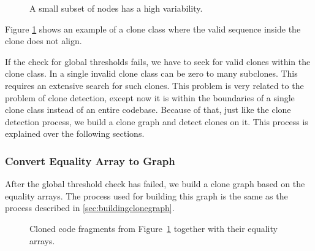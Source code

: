 \begin{figure}[H]
\begin{parcolumns}{3}
\end{parcolumns}
\caption{A small subset of nodes has a high variability.}
\label{fig:2rvariabilityhigh3}
\end{figure}

Figure \ref{fig:2rvariabilityhigh3} shows an example of a clone class where the valid sequence inside the clone does not align.

If the check for global thresholds fails, we have to seek for valid clones within the clone class. In a single invalid clone class can be zero to many subclones. This requires an extensive search for such clones. This problem is very related to the problem of clone detection, except now it is within the boundaries of a single clone class instead of an entire codebase. Because of that, just like the clone detection process, we build a clone graph and detect clones on it. This process is explained over the following sections.

\subsubsection{Convert Equality Array to Graph}
After the global threshold check has failed, we build a clone graph based on the equality arrays. The process used for building this graph is the same as the process described in \ref{sec:buildingclonegraph}.

\begin{figure}[H]
\begin{parcolumns}{3}
\end{parcolumns}
\caption{Cloned code fragments from Figure~\ref{fig:2rvariabilityhigh3} together with their equality arrays.}
\label{fig:2rvariabilityhigh4}
\end{figure}

